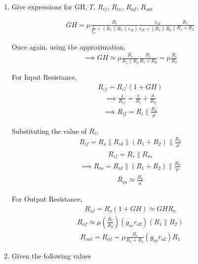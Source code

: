 \begin{enumerate}[label=\thesubsection.\arabic*.,ref=\thesubsection.\theenumi]
\item
Give expressions for GH, $T$, $R_{if}$, $R_{in}$, $R_{of}$, $R_{out}$

\solution
\begin{align}
    GH=\mu \frac{R_{i}}{\frac{1}{g_{m}}+(R_{1}\|R_{2}\| r_{o 2})} \frac{r_{o 2}}{r_{o 2}+(R_{1} \| R_{2})} \frac{R_{1}}{R_{1}+R_{2}}
\end{align}

Once again, using the approximation,
\begin{align}
    \implies GH \simeq \mu \frac{R_{i}}{R_{1} \| R_{2}} \frac{R_{1}}{R_{1}+R_{2}}=\mu \frac{R_{i}}{R_{2}}
\end{align}

For Input Resistance,
\begin{align}
    R_{if}=R_{i} /(1+GH)
\end{align}
\begin{align}
    \implies \frac{1}{R_{i f}}=\frac{1}{R_{i}}+\frac{\mu}{R_{2}}
\end{align}
\begin{align}
    \implies R_{i f}=R_{i} \| \frac{R_{2}}{\mu}
\end{align}

Substituting the value of $R_{i}$,
\begin{align}
    R_{if}=R_{s}\|R_{id}\|(R_{1}+R_{2}) \| \frac{R_{2}}{\mu}
\end{align}
\begin{align}
    R_{if}=R_{s} \| R_{in}
\end{align}
\begin{align}
    \implies R_{in}=R_{i d}\|(R_{1}+R_{2})\| \frac{R_{2}}{\mu}
\end{align}
\begin{align}
    R_{in} \simeq \frac{R_{2}}{\mu}
\end{align}

For Output Resistance,
\begin{align}
    R_{of}=R_{o}(1+GH) \simeq GH R_{o}
\end{align}
\begin{align}
    R_{of} \simeq \mu (\frac{R_{i}}{R_{2}})(g_{m} r_{o 2})(R_{1} \| R_{2})
\end{align}
\begin{align}
    R_{out} = R_{of}=\mu \frac{R_{i}}{R_{1}+R_{2}}(g_{m} r_{o 2}) R_{1}
\end{align}


\item
Given the following values
\begin{table}[!ht]
\centering

\caption{}
\label{table: Input_Table}
\end{table}


\end{enumerate}
